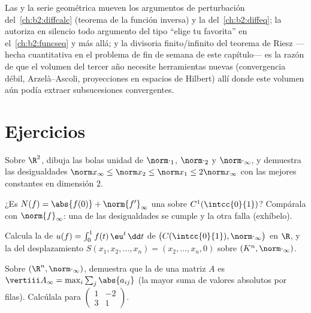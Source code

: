 \begin{remark}
Las  y la serie geométrica mueven los argumentos
de perturbación del~\cref{ch:b2:diffcalc} (teorema de la función
inversa) y la  del~\cref{ch:b2:diffeq}; la
 autoriza en silencio todo argumento del
tipo ``elige tu  favorita'' en el~\cref{ch:b2:funcseq} y más
allá; y la divisoria finito/infinito del teorema de Riesz ---hecha
cuantitativa en el problema de fin de semana de este capítulo--- es
la razón de que el volumen del tercer año necesite herramientas
nuevas (convergencia débil, Arzelà--Ascoli, proyecciones en
espacios de Hilbert) allí donde este volumen aún podía extraer
subsucesiones convergentes.
\end{remark}

\section{Ejercicios}

\begin{exercise}[$\star$]\label{exo:b2:nvs:1}
Sobre $\R^2$, dibuja las bolas unidad de $\norm\cdot_1$,
$\norm\cdot_2$ y $\norm\cdot_\infty$, y demuestra las desigualdades
$\norm x_\infty \leq \norm x_2 \leq \norm x_1 \leq 2\norm x_\infty$
con las mejores constantes en dimensión $2$.
\end{exercise}

\begin{exercise}[$\star$]\label{exo:b2:nvs:2}
¿Es $N(f) = \abs{f(0)} + \norm{f'}_\infty$ una  sobre
$C^1(\intcc{0}{1})$? Compárala con $\norm{f}_\infty$: una de las
desigualdades se cumple y la otra falla (exhíbelo).
\end{exercise}

\begin{exercise}[$\star$]\label{exo:b2:nvs:3}
Calcula la  de $u(f) = \int_0^1
f(t)\,\eu^t\,\dd t$ de $\bigl(C(\intcc{0}{1}),
\norm\cdot_\infty\bigr)$ en $\R$, y la del desplazamiento $S(x_1,
x_2, \dots, x_n) = (x_2, \dots, x_n, 0)$ sobre $(K^n,
\norm\cdot_\infty)$.
\end{exercise}

\begin{exercise}[$\star\star$]\label{exo:b2:nvs:4}
Sobre $(\R^n, \norm\cdot_\infty)$, demuestra que la
 de una matriz $A$ es $\vertiii A_\infty = \max_i
\sum_j \abs{a_{ij}}$ (la mayor suma de valores absolutos por filas).
Calcúlala para $\begin{pmatrix} 1 & -2\\ 3 & 1\end{pmatrix}$.
\end{exercise}

